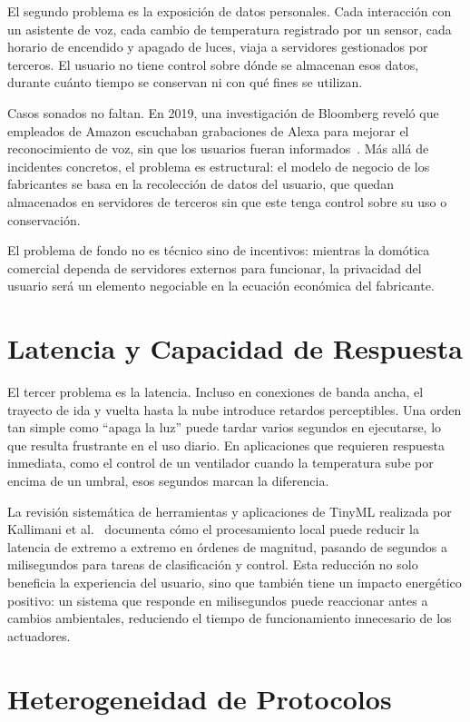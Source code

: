 El segundo problema es la exposición de datos personales. Cada interacción con un asistente de voz, cada cambio de temperatura registrado por un sensor, cada horario de encendido y apagado de luces, viaja a servidores gestionados por terceros. El usuario no tiene control sobre dónde se almacenan esos datos, durante cuánto tiempo se conservan ni con qué fines se utilizan.

Casos sonados no faltan. En 2019, una investigación de Bloomberg reveló que empleados de Amazon escuchaban grabaciones de Alexa para mejorar el reconocimiento de voz, sin que los usuarios fueran informados~\cite{bloomberg_alexa_2019}. Más allá de incidentes concretos, el problema es estructural: el modelo de negocio de los fabricantes se basa en la recolección de datos del usuario, que quedan almacenados en servidores de terceros sin que este tenga control sobre su uso o conservación.

El problema de fondo no es técnico sino de incentivos: mientras la domótica comercial dependa de servidores externos para funcionar, la privacidad del usuario será un elemento negociable en la ecuación económica del fabricante.

\section{Latencia y Capacidad de Respuesta}

El tercer problema es la latencia. Incluso en conexiones de banda ancha, el trayecto de ida y vuelta hasta la nube introduce retardos perceptibles. Una orden tan simple como ``apaga la luz'' puede tardar varios segundos en ejecutarse, lo que resulta frustrante en el uso diario. En aplicaciones que requieren respuesta inmediata, como el control de un ventilador cuando la temperatura sube por encima de un umbral, esos segundos marcan la diferencia.

La revisión sistemática de herramientas y aplicaciones de TinyML realizada por Kallimani et al.~\cite{kallimani_tinyml_2023} documenta cómo el procesamiento local puede reducir la latencia de extremo a extremo en órdenes de magnitud, pasando de segundos a milisegundos para tareas de clasificación y control. Esta reducción no solo beneficia la experiencia del usuario, sino que también tiene un impacto energético positivo: un sistema que responde en milisegundos puede reaccionar antes a cambios ambientales, reduciendo el tiempo de funcionamiento innecesario de los actuadores.

\section{Heterogeneidad de Protocolos}

